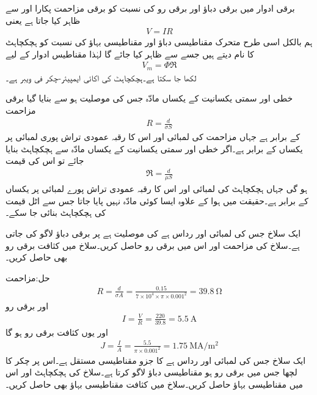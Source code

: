 برقی ادوار میں برقی دباؤ اور برقی رو کی نسبت  کو برقی مزاحمت پکارا اور  سے ظاہر کیا جاتا ہے یعنی
\begin{align}
V=I R
\end{align}
 ہم بالکل اسی طرح متحرک مقناطیسی دباؤ اور مقناطیسی بہاؤ کی  نسبت  کو ہچکچاہٹ کا نام دیتے ہیں جسے  سے ظاہر کیا جائے گا لہٰذا مقناطیس ادوار کے لیے
\begin{align}
V_m=\Phi \Re
\end{align}
لکھا جا سکتا ہے۔ہچکچاہٹ کی اکائی ایمپیئر-چکر فی ویبر  ہے۔

خطی اور  سمتی یکسانیت کے  یکساں مادّہ جس کی موصلیت  ہو سے بنایا گیا برقی مزاحمت
\begin{align}
R=\frac{d}{\sigma S}
\end{align}
کے برابر ہے جہاں مزاحمت کی لمبائی  اور اس کا رقبہ عمودی تراش پوری لمبائی پر یکساں  کے برابر ہے۔اگر خطی اور سمتی یکسانیت کے یکساں مادّہ سے ہچکچاہٹ بنایا جائے تو اس کی قیمت
\begin{align}
\Re=\frac{d}{\mu S}
\end{align}
ہو گی جہاں ہچکچاہٹ کی لمبائی  اور اس کا رقبہ عمودی تراش پورے لمبائی پر یکساں  کے برابر ہے۔حقیقت میں ہوا کے علاوہ ایسا کوئی مادّہ نہیں پایا جاتا جس سے اٹل قیمت کی ہچکچاہٹ بنائی جا سکے۔

ایک سلاخ جس کی لمبائی  اور رداس  ہے کی موصلیت  ہے پر  برقی دباؤ لاگو کی جاتی ہے۔سلاخ کی مزاحمت اور اس میں برقی رو حاصل کریں۔سلاخ میں کثافت برقی رو بھی حاصل کریں۔

حل:مزاحمت
\begin{align*}
R=\frac{d}{\sigma A}=\frac{0.15}{7 \times 10^4 \times \pi \times 0.001^2}=\SI{39.8}{\ohm}
\end{align*}
اور برقی رو
\begin{align*}
I=\frac{V}{R}=\frac{220}{39.8}=\SI{5.5}{\ampere}
\end{align*}
اور یوں کثافت برقی رو ہو گا
\begin{align*}
J=\frac{I}{A}=\frac{5.5}{\pi\times 0.001^2}=\SI{1.75}{\mega \ampere \per \meter \squared}
\end{align*}
ایک سلاخ جس کی لمبائی  اور رداس  ہے کا جزو مقناطیسی مستقل  ہے۔اس پر  چکر کا لچھا جس میں  برقی رو ہو مقناطیسی دباؤ لاگو کرتا ہے۔سلاخ کی ہچکچاہٹ اور اس میں مقناطیسی بہاؤ حاصل کریں۔سلاخ میں کثافت مقناطیسی بہاؤ بھی حاصل کریں۔

